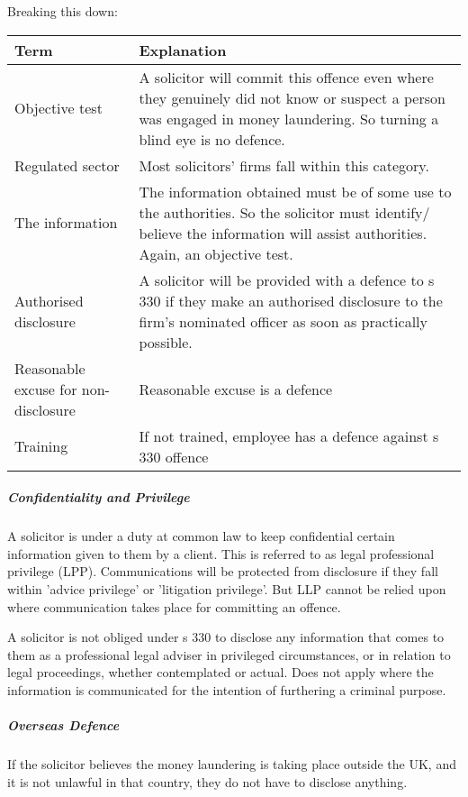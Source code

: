 \documentclass[
]{article}
\begin{document}
Breaking this down:

\begin{longtable}[]{@{}ll@{}}
\toprule()
Term & Explanation \\
\midrule()
\endhead
Objective test & A solicitor will commit this offence even where they
genuinely did not know or suspect a person was engaged in money
laundering. So turning a blind eye is no defence. \\
Regulated sector & Most solicitors' firms fall within this category. \\
The information & The information obtained must be of some use to the
authorities. So the solicitor must identify/ believe the information
will assist authorities. Again, an objective test. \\
Authorised disclosure & A solicitor will be provided with a defence to s
330 if they make an authorised disclosure to the firm's nominated
officer as soon as practically possible. \\
Reasonable excuse for non-disclosure & Reasonable excuse is a defence \\
Training & If not trained, employee has a defence against s 330
offence \\
\bottomrule()
\end{longtable}

\hypertarget{confidentiality-and-privilege-1}{%
\subparagraph{Confidentiality and
Privilege}\label{confidentiality-and-privilege-1}}

A solicitor is under a duty at common law to keep confidential certain
information given to them by a client. This is referred to as legal
professional privilege (LPP). Communications will be protected from
disclosure if they fall within 'advice privilege' or 'litigation
privilege'. But LLP cannot be relied upon where communication takes
place for committing an offence.

A solicitor is not obliged under s 330 to disclose any information that
comes to them as a professional legal adviser in privileged
circumstances, or in relation to legal proceedings, whether contemplated
or actual. Does not apply where the information is communicated for the
intention of furthering a criminal purpose.

\hypertarget{overseas-defence}{%
\subparagraph{Overseas Defence}\label{overseas-defence}}

If the solicitor believes the money laundering is taking place outside
the UK, and it is not unlawful in that country, they do not have to
disclose anything.
\end{document}
